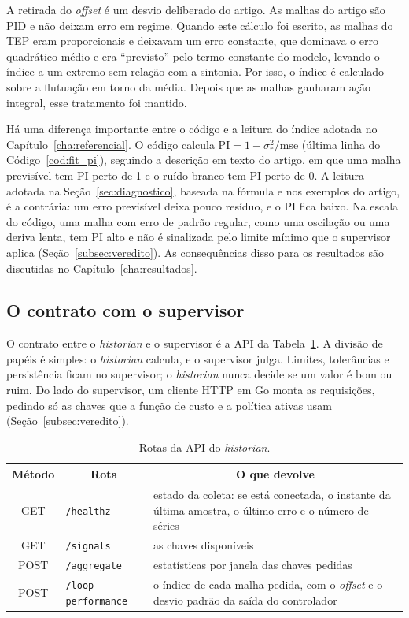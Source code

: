 A retirada do \textit{offset} é um desvio deliberado do artigo. As malhas do artigo são PID e não deixam erro em regime. Quando este cálculo foi escrito, as malhas do TEP eram proporcionais e deixavam um erro constante, que dominava o erro quadrático médio e era ``previsto'' pelo termo constante do modelo, levando o índice a um extremo sem relação com a sintonia. Por isso, o índice é calculado sobre a flutuação em torno da média. Depois que as malhas ganharam ação integral, esse tratamento foi mantido.

Há uma diferença importante entre o código e a leitura do índice adotada no Capítulo~\ref{cha:referencial}. O código calcula $\mathrm{PI} = 1 - \sigma^2_r/\mathrm{mse}$ (última linha do Código~\ref{cod:fit_pi}), seguindo a descrição em texto do artigo, em que uma malha previsível tem PI perto de 1 e o ruído branco tem PI perto de 0. A leitura adotada na Seção~\ref{sec:diagnostico}, baseada na fórmula e nos exemplos do artigo, é a contrária: um erro previsível deixa pouco resíduo, e o PI fica baixo. Na escala do código, uma malha com erro de padrão regular, como uma oscilação ou uma deriva lenta, tem PI alto e não é sinalizada pelo limite mínimo que o supervisor aplica (Seção~\ref{subsec:veredito}). As consequências disso para os resultados são discutidas no Capítulo~\ref{cha:resultados}.

\subsection{O contrato com o supervisor}
\label{subsec:contrato_historian}

O contrato entre o \textit{historian} e o supervisor é a API da Tabela~\ref{tab:api_historian}. A divisão de papéis é simples: o \textit{historian} calcula, e o supervisor julga. Limites, tolerâncias e persistência ficam no supervisor; o \textit{historian} nunca decide se um valor é bom ou ruim. Do lado do supervisor, um cliente HTTP em Go monta as requisições, pedindo só as chaves que a função de custo e a política ativas usam (Seção~\ref{subsec:veredito}).

\begin{table}[htbp]
	\centering
	\caption{Rotas da API do \textit{historian}.}
	\label{tab:api_historian}
	\footnotesize
	\begin{tabular}{clp{}}
		\hline
		\multicolumn{1}{c|}{\textbf{Método}} & \multicolumn{1}{c|}{\textbf{Rota}} & \multicolumn{1}{c}{\textbf{O que devolve}} \\
		\hline
		GET & \texttt{/healthz} & estado da coleta: se está conectada, o instante da última amostra, o último erro e o número de séries \\
		GET & \texttt{/signals} & as chaves disponíveis \\
		POST & \texttt{/aggregate} & estatísticas por janela das chaves pedidas \\
		POST & \texttt{/loop-performance} & o índice de cada malha pedida, com o \textit{offset} e o desvio padrão da saída do controlador \\
		\hline
	\end{tabular}
\end{table}

